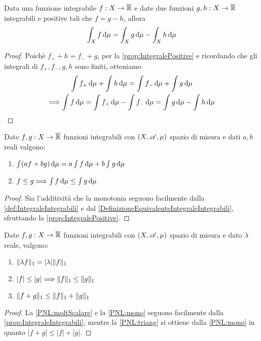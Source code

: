 \begin{lemma}\label{DefinizioneEquivalenteIntegraleIntegrabili}
	Data una funzione integrabile $f:X\to\overline{\mathbb R}$ e date due funzioni $g,h:X\to \overline{\mathbb R}$ integrabili e positive tali che $f=g-h$, allora
	\begin{equation*}
		\int_X f\,\mathrm d\mu=\int_Xg\,\mathrm d\mu-\int_Xh\,\mathrm d\mu
	\end{equation*}
\end{lemma}
\begin{proof}
	Poichè $f_++h=f_-+g$, per la \cref{prop:IntegralePositive} e ricordando che gli integrali di $f_+,f_-,g,h$ sono finiti, otteniamo
	\begin{gather*}
		\int  f_+\,\mathrm d\mu+\int  h\,\mathrm d\mu=\int  f_-\,\mathrm d\mu+\int  g\,\mathrm d\mu \\
		\Longrightarrow \int f\,\mathrm d\mu=\int f_+\,\mathrm d\mu-\int f_-\,\mathrm d\mu=\int g\,\mathrm d\mu-\int h\,\mathrm d\mu
	\end{gather*}

\end{proof}

\begin{proposition}\label{prop:IntegraleIntegrabili}
	Date $f,g:X\to\overline{\mathbb R}$ funzioni integrabili con $(X,\mathscr A,\mu)$ spazio di misura e dati $a,b$ reali valgono:
	\begin{enumerate}
		\item $\int (af+bg)\,\mathrm d\mu=a\int f\,\mathrm d\mu+b\int g\,\mathrm d\mu$ \label{PII:add}
		\item $f\le g\Longrightarrow \int f\,\mathrm d\mu\le \int g\,\mathrm d\mu$ \label{PII:mono}
	\end{enumerate}
\end{proposition}
\begin{proof}
	Sia l'additività che la monotonia seguono facilmente dalla \cref{def:IntegraleIntegrabili} e dal \cref{DefinizioneEquivalenteIntegraleIntegrabili}, sfruttando la \cref{prop:IntegralePositive}.
\end{proof}

\begin{corollary}\label{cor:ProprietaNormaL1}
	Date $f,g:X\to\overline{\mathbb R}$ funzioni integrabili con $(X,\mathscr A,\mu)$ spazio di misura e dato $\lambda$ reale, valgono:
	\begin{enumerate}
		\item $\Vert \lambda f\Vert_1=|\lambda|\Vert f\Vert_1$ \label{PNL:moltScalare}
		\item $|f|\le |g|\Longrightarrow \Vert f\Vert_1\le \Vert g\Vert_1$ \label{PNL:mono}
		\item $\Vert f+g\Vert_1\le\Vert f\Vert_1+\Vert g\Vert_1$ \label{PNL:triang}
	\end{enumerate}
\end{corollary}
\begin{proof}
	La \ref{PNL:moltScalare} e la \ref{PNL:mono} seguono facilmente dalla \cref{prop:IntegraleIntegrabili}, mentre la \ref{PNL:triang} si ottiene dalla \ref{PNL:mono} in quanto $|f+g|\le|f|+|g|$.
\end{proof}



